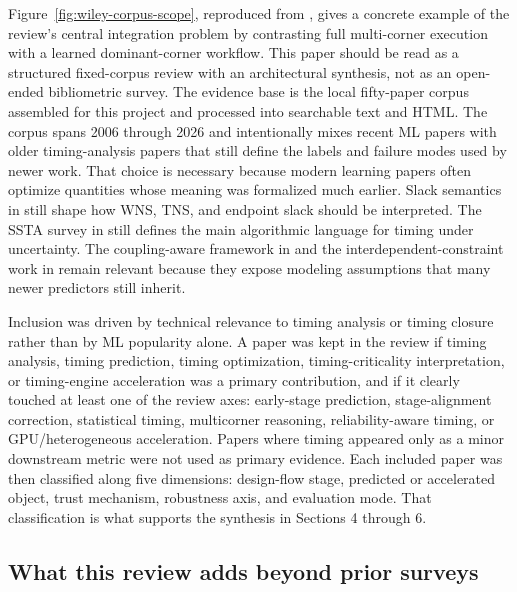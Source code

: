 \documentclass[num-refs]{wiley-article}
\begin{document}
    Figure~\ref{fig:wiley-corpus-scope}, reproduced from \cite{ref28}, gives a concrete example of the review's central integration problem by contrasting full multi-corner execution with a learned dominant-corner workflow. This paper should be read as a structured fixed-corpus review with an architectural synthesis, not as an open-ended bibliometric survey. The evidence base is the local fifty-paper corpus assembled for this project and processed into searchable text and HTML. The corpus spans 2006 through 2026 and intentionally mixes recent ML papers with older timing-analysis papers that still define the labels and failure modes used by newer work. That choice is necessary because modern learning papers often optimize quantities whose meaning was formalized much earlier. Slack semantics in \cite{ref50} still shape how WNS, TNS, and endpoint slack should be interpreted. The SSTA survey in \cite{ref49} still defines the main algorithmic language for timing under uncertainty. The coupling-aware framework in \cite{ref48} and the interdependent-constraint work in \cite{ref46} remain relevant because they expose modeling assumptions that many newer predictors still inherit.


    Inclusion was driven by technical relevance to timing analysis or timing closure rather than by ML popularity alone. A paper was kept in the review if timing analysis, timing prediction, timing optimization, timing-criticality interpretation, or timing-engine acceleration was a primary contribution, and if it clearly touched at least one of the review axes: early-stage prediction, stage-alignment correction, statistical timing, multicorner reasoning, reliability-aware timing, or GPU/heterogeneous acceleration. Papers where timing appeared only as a minor downstream metric were not used as primary evidence. Each included paper was then classified along five dimensions: design-flow stage, predicted or accelerated object, trust mechanism, robustness axis, and evaluation mode. That classification is what supports the synthesis in Sections 4 through 6.


    \subsection{What this review adds beyond prior surveys}
\end{document}
